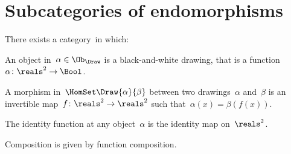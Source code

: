

\section{Subcategories of endomorphisms}
\label{sec:Draw}




\index{\Draw}
\begin{definition}[Drawings]
    \label{def:Draw}
    There exists a category~\Draw in which:
    \begin{compactenum}
        \item An object in~$\alpha\in \Ob_\Draw$ is a black-and-white drawing,
              that is a function~$\alpha \colon \reals^2 \to \Bool$.
        \item A morphism in~$\HomSet\Draw{\alpha}{\beta}$ between two drawings~$\alpha$ and~$\beta$ is an invertible map~$f\colon \reals^2 \to \reals^2$ such that~$\alpha(x) = \beta(f(x))$.
        \item The identity function at any object~$\alpha$ is the identity map on~$\reals^2$.
        \item Composition is given by function composition.
    \end{compactenum}
\end{definition}

